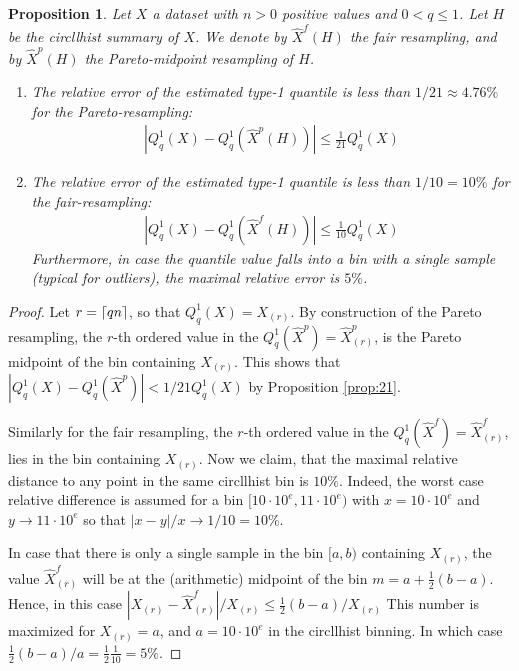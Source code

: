 \documentclass{article}
\DeclarePairedDelimiter{\ceil}{\lceil}{\rceil}
\theoremstyle{plain}
\newtheorem{proposition}[definition]{Proposition}
\theoremstyle{remark}
\newcommand{\ra}{\rightarrow}
\begin{document}
\begin{proposition}
  Let $X$ a dataset with $n > 0$ positive values and $0 < q \leq 1$. Let $H$ be the circllhist summary of $X$.
  We denote by $\hat{X}^f(H)$ the fair resampling, and by $\hat{X}^p(H)$ the Pareto-midpoint resampling of $H$.
  \begin{enumerate}
  \item The relative error of the estimated type-1 quantile is less than $1/21 \approx 4.76\%$ for
    the Pareto-resampling:
    \begin{align*}
      |Q^1_q(X) - Q^1_q(\hat{X}^p(H))| \leq \frac{1}{21} Q^1_q(X)
    \end{align*}
  \item The relative error of the estimated type-1 quantile is less than $1/10 = 10\%$ for
    the fair-resampling:
    \begin{align*}
      |Q^1_q(X) - Q^1_q(\hat{X}^f(H))| \leq \frac{1}{10} Q^1_q(X)
    \end{align*}
    Furthermore, in case the quantile value falls into a bin with a single sample (typical for
    outliers), the maximal relative error is $5\%$.
  \end{enumerate}
\end{proposition}

\begin{proof}
  Let $r = \ceil{q n}$, so that $Q^1_q(X) = X_{(r)}$.
  By construction of the Pareto resampling, the $r$-th ordered value in the $Q^1_q(\hat{X}^p) = \hat{X}^p_{(r)}$,
  is the Pareto midpoint of the bin containing $X_{(r)}$.
  This shows that $|Q^1_q(X) - Q^1_q(\hat{X}^p)| < 1/21 Q^1_q(X)$ by Proposition \ref{prop:21}.

  Similarly for the fair resampling, the $r$-th ordered value in the $Q^1_q(\hat{X}^f) = \hat{X}^f_{(r)}$,
  lies in the bin containing $X_{(r)}$.
  Now we claim, that the maximal relative distance to any point in the same circllhist bin is $10\%$.
  Indeed, the worst case relative difference is assumed for a bin $[10 \cdot 10^e, 11 \cdot 10^e)$ with
  $x = 10 \cdot 10^e$ and $y \ra 11 \cdot 10^e$ so that $|x-y|/x \ra 1/10 = 10\%$.

  In case that there is only a single sample in the bin $[a,b)$ containing $X_{(r)}$, the value
  $\hat{X}^f_{(r)}$ will be at the (arithmetic) midpoint of the bin $m = a+\frac{1}{2}(b-a)$.
  Hence, in this case $|X_{(r)} - \hat{X}^f_{(r)}| / X_{(r)} \leq \frac{1}{2} (b-a)/X_{(r)}$
  This number is maximized for $X_{(r)} = a$, and $a = 10 \cdot 10^e$ in the circllhist binning.
  In which case $\frac{1}{2} (b-a)/a =\frac{1}{2} \frac{1}{10} = 5\%$.
\end{proof}
\end{document}
